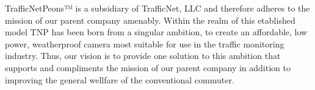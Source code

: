 TrafficNetPeons™ is a subsidiary of TrafficNet, LLC and therefore adheres to the mission of our parent company amenably. Within the realm of this etablished model TNP has been born from a singular ambition, to create an affordable, low power, weatherproof camera most suitable for use in the traffic monitoring industry. Thus, our vision is to provide one solution to this ambition that supports and compliments the mission of our parent company in addition to improving the general wellfare of the conventional commuter.
